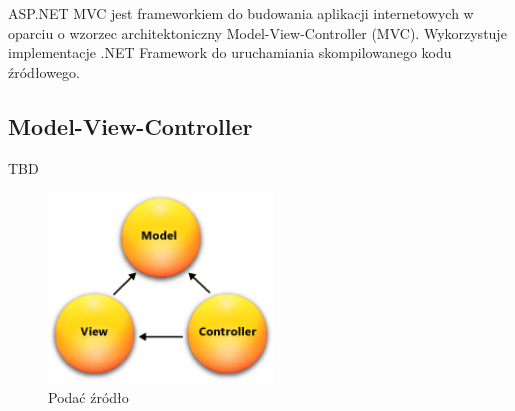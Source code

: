 ASP.NET MVC jest frameworkiem do budowania aplikacji internetowych w oparciu o wzorzec architektoniczny Model-View-Controller (MVC). Wykorzystuje implementacje .NET Framework do uruchamiania skompilowanego kodu źródłowego.


\subsection{Model-View-Controller}

TBD

\begin{figure}[h]
	\centering
	\includegraphics[height=50.5mm]{images/mvc.png}
	 \caption{Podać źródło}
\end{figure}